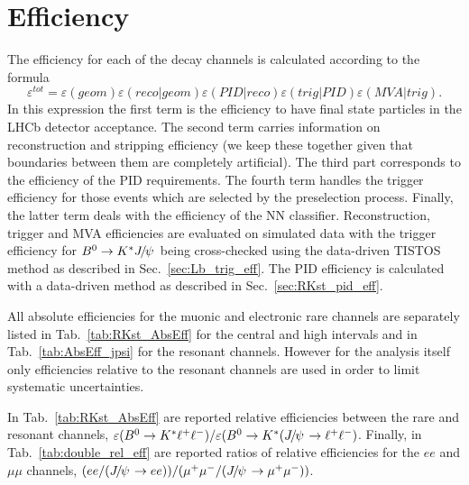\chapter{Efficiency}
\label{sec:Rkst_efficiency}


The efficiency for each of the decay channels is calculated according to the formula
\begin{equation}
\varepsilon^{tot}=\varepsilon(geom)\varepsilon(reco|geom)\varepsilon(PID|reco)\varepsilon(trig|PID)\varepsilon(MVA|trig).
\end{equation}
In this expression the first term is the efficiency to have final state particles in the LHCb detector 
acceptance. The second term carries information on reconstruction and stripping efficiency
(we keep these together given that boundaries between them are completely artificial).
The third part corresponds to the efficiency of the PID requirements.
The fourth term handles the trigger efficiency for those events which are selected by the preselection process.
Finally, the latter term deals with the efficiency of the NN classifier.
Reconstruction, trigger and MVA efficiencies are evaluated on simulated data with the trigger efficiency
for $\Bz\to\Kstar\jpsi$ being cross-checked using the data-driven TISTOS method as described in Sec.~\ref{sec:Lb_trig_eff}.
The PID efficiency is calculated with a data-driven method as described in Sec.~\ref{sec:RKst_pid_eff}.

All absolute efficiencies for the muonic and electronic rare channels are separately listed in Tab.~\ref{tab:RKst_AbsEff}
for the central and high \qsq intervals and in Tab.~\ref{tab:AbsEff_jpsi} for the resonant channels.
However for the analysis itself only efficiencies relative to the resonant channels are used in order
to limit systematic uncertainties.

In Tab.~\ref{tab:RKst_AbsEff} are reported relative efficiencies between the rare and resonant channels,
$\varepsilon(\Bz\to\Kstar \ell^+\ell^-)/\varepsilon(\Bz\to\Kstar(\jpsi\to \ell^+\ell^-)$.
Finally, in Tab.~\ref{tab:double_rel_eff} are reported ratios of relative efficiencies
for the $ee$ and $\mu\mu$ channels, $(ee/(\jpsi \to ee))/(\mumu/(\jpsi\to \mumu))$.

